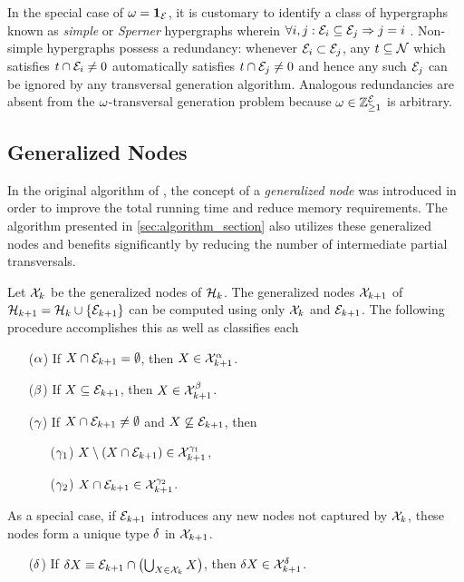 \documentclass[aps, 10pt, english, twoside, twocolumn, pra, nofootinbib, tightenlines, longbibliography, superscriptaddress]{revtex4-1}
\begin{document}
    In the special case of $\omega = \mathbf{1}_{\mathcal{E}}$, it is customary to identify a class of hypergraphs known as \textit{simple} or \textit{Sperner} hypergraphs wherein $\forall i, j : \mathcal{E}_i \subseteq \mathcal{E}_j \Rightarrow j = i$ \cite{Berge_1984}. Non-simple hypergraphs possess a redundancy: whenever $\mathcal{E}_i \subset \mathcal{E}_j$, any $t \subseteq \mathcal{N}$ which satisfies $t \cap \mathcal{E}_i \neq 0$ automatically satisfies $t \cap \mathcal{E}_j \neq 0$ and hence any such $\mathcal{E}_j$ can be ignored by any transversal generation algorithm. Analogous redundancies are absent from the $\omega$-transversal generation problem because $\omega \in {\mathbb{Z}}_{\geq 1}^{\mathcal{E}}$ is arbitrary.

    \subsection{Generalized Nodes}

    In the original algorithm of \citet{Kavvadias_2005}, the concept of a \textit{generalized node} was introduced in order to improve the total running time and reduce memory requirements. The algorithm presented in \cref{sec:algorithm_section} also utilizes these generalized nodes and benefits significantly by reducing the number of intermediate partial transversals.

    Let $\mathcal{X}_{k}$ be the generalized nodes of $\mathcal{H}_{k}$. The generalized nodes $\mathcal{X}_{k+1}$ of $\s H_{k+1} = \s H_{k} \cup \bc{\edges_{k+1}}$ can be computed using only $\mathcal{X}_{k}$ and $\mathcal{E}_{k+1}$. The following procedure accomplishes this as well as classifies each
    \begin{itemize}
        \item[($\alpha$)] If $X \cap \mathcal{E}_{k+1} = \emptyset$, then $X \in \mathcal{X}^{\alpha}_{k+1}$.
        \item[($\beta$)] If $X \subseteq \mathcal{E}_{k+1}$, then $X \in \mathcal{X}^{\beta}_{k+1}$.
        \item[($\gamma$)] If $X \cap \mathcal{E}_{k+1} \neq \emptyset$ and $X \not \subseteq \mathcal{E}_{k+1}$, then
        \begin{itemize}
            \item[($\gamma_1$)] $X \setminus \br{X \cap \edges_{k+1}} \in \s X^{\ga_1}_{k+1}$,
            \item[($\gamma_2$)] $X \cap \mathcal{E}_{k+1} \in \mathcal{X}^{\gamma_2}_{k+1}$.
        \end{itemize}
    \end{itemize}
    As a special case, if $\mathcal{E}_{k+1}$ introduces any new nodes not captured by $\mathcal{X}_{k}$, these nodes form a unique type $\delta$ in $\mathcal{X}_{k+1}$.
    \begin{itemize}
        \item[($\delta$)] If $\de X \defined \edges_{k+1} \cap \br{\bigcup_{X \in \s X_{k}} X}$, then $\delta X \in \mathcal{X}_{k+1}^{\delta}$.
    \end{itemize}
\end{document}
